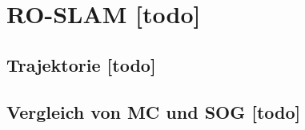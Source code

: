 \section{RO-SLAM [todo]}


\begin{comment}
--------------------------------------------------------------------------------
\end{comment}
\subsection{Trajektorie [todo]}


\begin{comment}
--------------------------------------------------------------------------------
\end{comment}
\subsection{Vergleich von MC und SOG [todo]}

